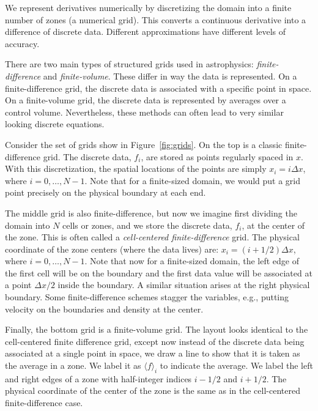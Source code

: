We represent derivatives numerically by discretizing the domain into
a finite number of zones (a numerical grid).
This converts a continuous derivative into a difference of discrete data.
Different approximations have different levels of accuracy.

There are two main types of structured grids used in astrophysics:
{\em finite-difference} and {\em finite-volume}.  These differ in way
the data is represented.  On a finite-difference grid, the discrete
data is associated with a specific point in space.  On a
finite-volume grid, the discrete data is represented by averages over
a control volume.  Nevertheless, these methods can often lead to very
similar looking discrete equations.

Consider the set of grids show in Figure~\ref{fig:grids}.  On the top
is a classic finite-difference grid.  The discrete data, $f_i$, are
stored as points regularly spaced in $x$.  With this discretization,
the spatial locations of the points are simply $x_i = i \Delta x$,
where $i = 0, \ldots, N-1$.  Note that for a finite-sized domain, we
would put a grid point precisely on the physical boundary at each end.

The middle grid is also finite-difference, but now we imagine first
dividing the domain into $N$ cells or zones, and we store the discrete
data, $f_i$, at the center of the zone.  This is often called a {\em
  cell-centered finite-difference} grid.  The physical coordinate of
the zone centers (where the data lives) are: $x_i = (i + 1/2)\Delta
x$, where $i = 0, \ldots, N-1$.  Note that now for a finite-sized
domain, the left edge of the first cell will be on the boundary and
the first data value will be associated at a point $\Delta x/2$ inside
the boundary.  A similar situation arises at the right physical
boundary.  Some finite-difference schemes stagger the variables,
e.g., putting velocity on the boundaries and density at the center.

Finally, the bottom grid is a finite-volume grid.  The layout looks
identical to the cell-centered finite difference grid, except now
instead of the discrete data being associated at a single point in
space, we draw a line to show that it is taken as the average in a
zone.  We label it as $\langle f\rangle_i$ to indicate the average.
We label the left and right edges of a zone with half-integer indices
$i-1/2$ and $i+1/2$.  The physical coordinate of the center of the zone
is the same as in the cell-centered finite-difference case.


